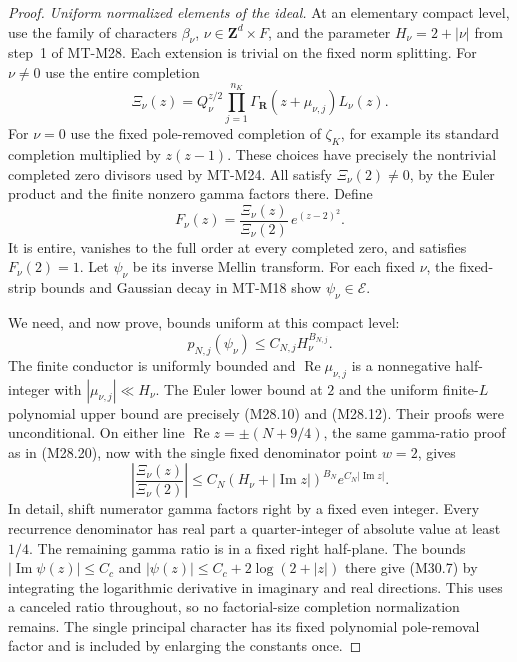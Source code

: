 \begin{proof}
\emph{Uniform normalized elements of the ideal.}
At an elementary compact level, use the family of
characters \(\beta_\nu\), \(\nu\in\mathbf Z^d\times F\),
and the parameter \(H_\nu=2+|\nu|\) from step~1 of
MT-M28. Each extension is trivial on the fixed norm
splitting. For \(\nu\ne0\) use the entire completion
\[
 \Xi_\nu(z)=Q_\nu^{z/2}
        \prod_{j=1}^{n_K}\Gamma_{\mathbf R}(z+\mu_{\nu,j})
                         L_\nu(z).
 \]
For \(\nu=0\) use the fixed pole-removed completion
of \(\zeta_K\), for example its standard completion
multiplied by \(z(z-1)\). These choices have precisely
the nontrivial completed zero divisors used by MT-M24.
All satisfy \(\Xi_\nu(2)\ne0\), by the Euler product
and the finite nonzero gamma factors there.
Define
\[
          F_\nu(z)=
              \frac{\Xi_\nu(z)}{\Xi_\nu(2)}\,e^{(z-2)^2}.
                                                               \tag{M30.5}
\]
It is entire, vanishes to the full order at every
completed zero, and satisfies \(F_\nu(2)=1\).
Let \(\psi_\nu\) be its inverse Mellin transform.
For each fixed \(\nu\), the fixed-strip bounds and
Gaussian decay in MT-M18 show
\(\psi_\nu\in\mathcal E\).

We need, and now prove, bounds uniform at this
compact level:
\[
           p_{N,j}(\psi_\nu)
                        \le C_{N,j}H_\nu^{B_{N,j}}.            \tag{M30.6}
\]
The finite conductor is uniformly bounded and
\(\operatorname{Re}\mu_{\nu,j}\) is a nonnegative
half-integer with \(|\mu_{\nu,j}|\ll H_\nu\).
The Euler lower bound at \(2\) and the uniform
finite-\(L\) polynomial upper bound are precisely
(M28.10) and (M28.12). Their proofs were
unconditional. On either line
\(\operatorname{Re}z=\pm(N+9/4)\), the same
gamma-ratio proof as in (M28.20), now with the
single fixed denominator point \(w=2\), gives
\[
 \left|\frac{\Xi_\nu(z)}{\Xi_\nu(2)}\right|
       \le C_N(H_\nu+|\operatorname{Im}z|)^{B_N}
                              e^{C_N|\operatorname{Im}z|}.
                                                               \tag{M30.7}
\]
In detail, shift numerator gamma factors right
by a fixed even integer. Every recurrence
denominator has real part a quarter-integer
of absolute value at least \(1/4\). The
remaining gamma ratio is in a fixed right
half-plane. The bounds
\(|\operatorname{Im}\psi(z)|\le C_c\) and
\(|\psi(z)|\le C_c+2\log(2+|z|)\) there
give (M30.7) by integrating the logarithmic
derivative in imaginary and real directions.
This uses a canceled ratio throughout, so
no factorial-size completion normalization
remains. The single principal character
has its fixed polynomial pole-removal
factor and is included by enlarging
the constants once.


\end{proof}
